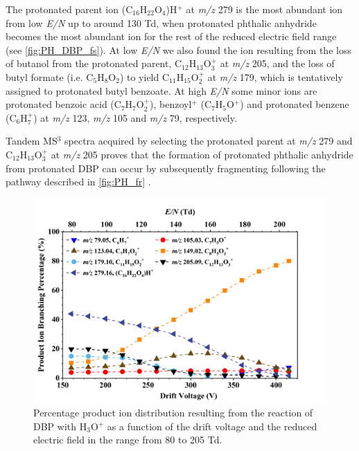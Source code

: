 %
The protonated parent ion  (C$_{16}$H$_{22}$O$_4$)H$^+$ at \textit{m/z} 279 is the most abundant ion from low \textit{E/N} up to around 130 Td, when protonated phthalic anhydride becomes the most abundant ion for the rest of the reduced electric field range (see \autoref{fig:PH_DBP_fs}).
%
At low \textit{E/N} we also found the  ion resulting from the loss of butanol from the protonated parent, C$_{12}$H$_{13}$O$_3^+$ at \textit{m/z} 205,  and the loss of butyl formate (i.e. C$_{5}$H$_{8}$O$_2$) to yield C$_{11}$H$_{15}$O$_2^+$ at \textit{m/z} 179, which is tentatively assigned to protonated butyl benzoate.
%
At high \textit{E/N} some minor ions are protonated benzoic acid (C$_{7}$H$_{7}$O$_2^+$), benzoyl$^+$ (C$_7$H$_{5}$O$^+$) and protonated benzene (C$_6$H$_{7}^+$) at \textit{m/z} 123, \textit{m/z} 105 and \textit{m/z} 79, respectively.


Tandem MS$^3$ spectra acquired by selecting the protonated parent at \textit{m/z} 279 and C$_{12}$H$_{13}$O$_3^+$ at \textit{m/z} 205 proves that the formation of protonated phthalic anhydride from protonated DBP can occur by subsequently fragmenting following the pathway described in \autoref{fig:PH_fr} \cite{mzcloudDBP}.
%



\begin{figure}[htb]%
\centering
\includegraphics[height=0.4\textheight]{pics/DBP-BR.png}
\caption{Percentage product ion distribution resulting from the reaction of DBP with H$_3$O$^+$ as a function of the drift voltage and the reduced electric field in the range from 80 to 205 Td.}
\label{fig:PH_DBP_fs}
\end{figure}




